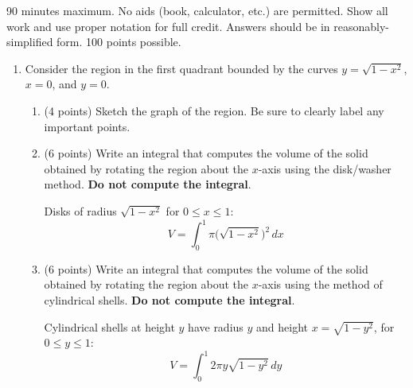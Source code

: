 \documentclass[12pt]{article}
\newcommand{\ds}{\displaystyle}
\begin{document}
90 minutes maximum.  No aids (book, calculator, etc.) are permitted.
Show all work and use proper notation for full credit.  Answers should
be in reasonably-simplified form.  100 points possible.

\begin{enumerate}

\item Consider the region in the first quadrant bounded by the curves
  $\ds y = \sqrt{1-x^2}$, $x=0$, and $y=0$.
  \begin{enumerate}
  \item (4 points) Sketch the graph of the region. Be sure to clearly label
    any important points.
    \begin{solution}
      \begin{center}
      \end{center}
    \end{solution}
    \vfill

  \item (6 points) Write an integral that computes the volume of the solid
    obtained by rotating the region about the $x$-axis using the
    disk/washer method. {\bf Do not compute the integral}.
    \begin{solution}
      Disks of radius $\sqrt{1-x^2}$ for $0 \le x \le 1$:
      \[
        \boxed{V = \int_0^1 \pi\big(\sqrt{1-x^2}\big)^2\,dx}
      \]
    \end{solution}
    \vfill

  \item (6 points) Write an integral that computes the volume of the solid
    obtained by rotating the region about the $x$-axis using the method of
    cylindrical shells. {\bf Do not compute the integral}.
    \begin{solution}
      Cylindrical shells at height $y$ have radius $y$ and height $x = \sqrt{1-y^2}$,
      for $0 \le y \le 1$:
      \[
        \boxed{V = \int_0^1 2\pi y\sqrt{1-y^2}\,dy}
      \]
    \end{solution}
    \vfill


\end{enumerate}
\end{enumerate}
\end{document}
